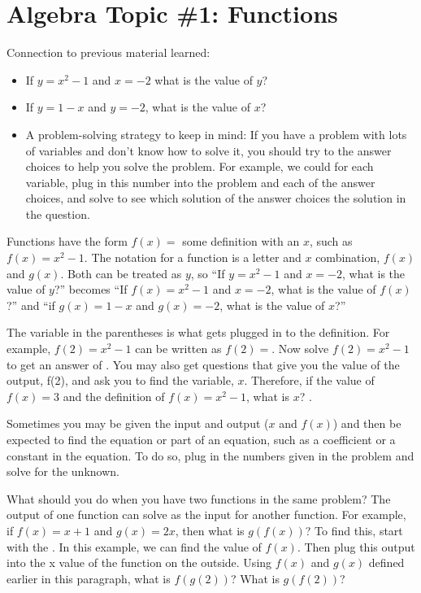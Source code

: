 \newpage
\section[Functions]{Algebra Topic \#1: Functions}

Connection to previous material learned:

\begin{itemize}
\item If $y=x^2-1$ and $x=-2$ what is the value of $y$? \longline
\item If $y=1-x$ and $y=-2$, what is the value of $x$? \longline
\item A problem-solving strategy to keep in mind: If you have a problem with lots of variables and don't know how to solve it, you should try to \longline the answer choices to help you solve the problem. For example, we could \longline for each variable, plug in this number into the problem and each of the answer choices, and solve to see which solution of the answer choices \longline the solution in the question.
\end{itemize}

\vfill
Functions have the form $f(x)=$ some definition with an $x$, such as $f(x)=x^2-1$. The notation for a function is a letter and $x$ combination, $f(x)$ and $g(x)$. Both can be treated as $y$, so ``If $y=x^2-1$ and $x=-2$, what is the value of $y$?” becomes ``If $f(x)=x^2-1$ and $x=-2$, what is the value of $f(x)$?'' and ``if $g(x)=1-x$ and $g(x)=-2$, what is the value of $x$?'' \longline

\vfill
The variable in the parentheses is what gets plugged in to the definition. For example, $f(2)=x^2-1$ can be written as $f(2)=$\longline. Now solve $f(2)=x^2-1$ to get an answer of \longline. You may also get questions that give you the value of the output, f(2), and ask you to find the variable, $x$. Therefore, if the value of $f(x)=3$ and the definition of $f(x)=x^2-1$, what is $x$? \longline.

\vfill
Sometimes you may be given the input and output ($x$ and $f(x)$) and then be expected to find the equation or part of an equation, such as a coefficient or a constant in the equation. To do so, plug in the numbers given in the problem and solve for the unknown.

\vfill
What should you do when you have two functions in the same problem? The output of one function can solve as the input for another function. For example, if $f(x)=x+1$ and $g(x)=2x$, then what is $g(f(x))$? To find this, start with the \longline. In this example, we can find the value of $f(x)$. Then plug this output into the x value of the function on the outside. Using $f(x)$ and $g(x)$ defined earlier in this paragraph, what is $f(g(2))$? What is $g(f(2))$? \longline

